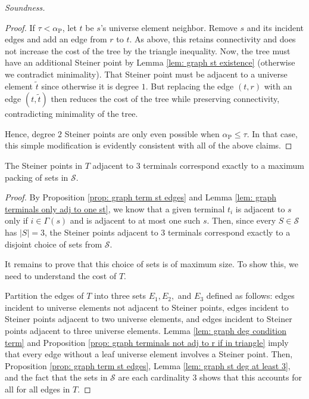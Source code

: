 \documentclass{article}\providecommand{\DeclareRedundantLanguages}[2]{}\usepackage[a4paper,margin=20mm]{geometry}
\newcommand{\1}{\textbf{1}}
\newcommand{\td}{\tau}
\newcommand{\trd}{\alpha_{\text{P}}}
\renewcommand{\tilde}{\widetilde}
\begin{document}
\begin{paragraph}{\textit{Soundness.}}
\begin{proof}
If $\td < \trd$, let $t$ be $s$'s universe element neighbor. Remove $s$ and its incident edges and add an edge from $r$ to $t$. As above, this retains connectivity and does not increase the cost of the tree by the triangle inequality. Now, the tree must have an additional Steiner point by Lemma \ref{lem: graph st existence} (otherwise we contradict minimality). That Steiner point must be adjacent to a universe element $\tilde{t}$ since otherwise it is degree $1$. But replacing the edge $(t,r)$ with an edge $(t, \tilde{t})$ then reduces the cost of the tree while preserving connectivity, contradicting minimality of the tree.

Hence, degree $2$ Steiner points are only even possible when $\trd \leq \td$. In that case, this simple modification is evidently consistent with all of the above claims.
\end{proof}
 
 \begin{lemma} \label{lem: graph max packing}
The Steiner points in $T$ adjacent to $3$ terminals correspond exactly to a maximum packing of sets in $\mathcal{S}$.
 \end{lemma}
 \begin{proof}
By Proposition \ref{prop: graph term st edges} and Lemma \ref{lem: graph terminals only adj to one st}, we know that a given terminal $t_i$ is adjacent to $s$ only if $i \in \Gamma(s)$ and is adjacent to at most one such $s$. Then, since every $S \in \mathcal{S}$ has $|S| = 3$, the Steiner points adjacent to $3$ terminals correspond exactly to a disjoint choice of sets from $\mathcal{S}$.

It remains to prove that this choice of sets is of maximum size. To show this, we need to understand the cost of $T$. 

Partition the edges of $T$ into three sets $E_1, E_2,$ and $E_3$ defined as follows: edges incident to universe elements not adjacent to Steiner points, edges incident to Steiner points adjacent to two universe elements, and edges incident to Steiner points adjacent to three universe elements. 
Lemma \ref{lem: graph deg condition term} and Proposition \ref{prop: graph terminals not adj to r if in triangle} imply that every edge without a leaf universe element involves a Steiner point. Then, Proposition \ref{prop: graph term st edges}, Lemma \ref{lem: graph st deg at least 3}, and the fact that the sets in $\mathcal{S}$ are each cardinality $3$ shows that this accounts for all for all edges in $T$.



\end{proof}
\end{paragraph}
\end{document}

